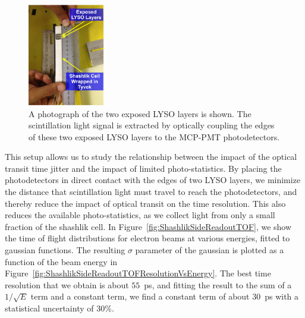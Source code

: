\documentclass[12pt]{article}
\begin{document}
\begin{figure}[H] \centering
\includegraphics[width=0.30\textwidth]{figs/ShashlikSideReadoutPhotoA} 
\caption{ A photograph of the two exposed LYSO layers is shown.
The scintillation light signal is extracted by optically coupling
the edges of these two exposed LYSO layers to the MCP-PMT
photodetectors. } 
\label{fig:ShashlikSideReadoutExposedLayersPhoto}
\end{figure}


This setup allows us to study the relationship between the impact of the 
optical transit time jitter and the impact of limited photo-statistics.  
By placing the photodetectors in direct contact with the edges of two 
LYSO layers, we minimize the distance that scintillation light must 
travel to reach the photodetectors, and thereby reduce the impact 
of optical transit on the time resolution. This also reduces the 
available photo-statistics, as we collect light from only a small 
fraction of the shashlik cell. In Figure~\ref{fig:ShashlikSideReadoutTOF}, 
we show the time of flight distributions for electron beams at 
various energies, fitted to gaussian functions. The resulting
$\sigma$ parameter of the gaussian is plotted as a function of the
beam energy in Figure~\ref{fig:ShashlikSideReadoutTOFResolutionVsEnergy}.
The best time  resolution that we obtain is about $55$~ps, and
fitting the result to the sum of a $1/\sqrt{E}$ term and a constant term,
we find a constant term of about $30$~ps with a statistical uncertainty of $30\%$. 
\end{document}
